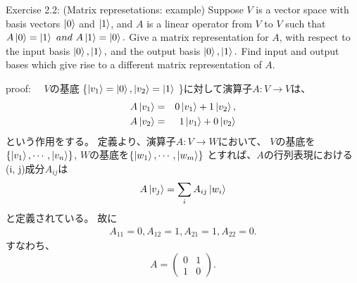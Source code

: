 \begin{flushleft}
{\Large Exercise 2.2: (Matrix represetations: example)}
 Suppose $V$ is a vector space with basis vectors $\ket{0}$ and $\ket{1}$,
and $A$ is a linear operator from $V$ to $V$ such that 
$A\ket{0} = \ket{1} ~and~ A\ket{1} = \ket{0}.$ 
Give a matrix representation for $A$, with respect to the input basis 
$\ket{0}, \ket{1},$ and the output basis $\ket{0}, \ket{1}.$ 
Find input and output bases which give rise to a different matrix representation of $A$.

\vspace{0.1in}
{\large proof:}
　$V$の基底
\{$
 \ket{v_1} = \ket{0}, \ket{v_2}=\ket{1} 
$
\}に対して演算子$A:V \to V $は、
\setcounter{equation}{0}
\begin{eqnarray*}
A\ket{v_1} &=& 0\ket{v_1} + 1\ket{v_2},\\
A\ket{v_2} &=& 1\ket{v_1} + 0\ket{v_2}
\end{eqnarray*}
という作用をする。
\newline
定義より、演算子$A:V \to W $において、
$V$の基底を$\{\ket{v_1},\cdots, \ket{v_n}\}$, 
\newline
$W$の基底を$\{\ket{w_1},\cdots, \ket{w_m}\}$
\newline
とすれば、$A$の行列表現における(i, j)成分$A_{ij}$は
\begin{eqnarray}
A\ket{v_j} = \sum_{i} A_{ij} \ket{w_i}
\end{eqnarray}
と定義されている。
 故に
\begin{eqnarray*}
A_{11}=0,
A_{12}=1,
A_{21}=1,
A_{22}=0.
\end{eqnarray*}
\newline
すなわち、
\[
A = \left(
	\begin{array}{cc}
	0 & 1\\
	1 & 0
	\end{array}
	\right).
\]

 \end{flushleft}

